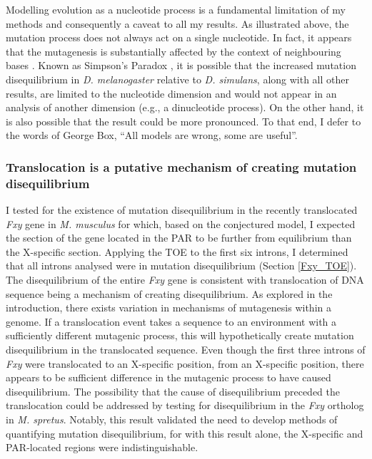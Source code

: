 Modelling evolution as a nucleotide process is a fundamental limitation of my methods and consequently a caveat to all my results. As illustrated above, the mutation process does not always act on a single nucleotide. In fact, it appears that the mutagenesis is substantially affected by the context of neighbouring bases \citep{Zhu2020MachineMutations}. Known as Simpson's Paradox \citep{Simpson1951TheTables}, it is possible that the increased mutation disequilibrium in \textit{D. melanogaster} relative to \textit{D. simulans}, along with all other results, are limited to the nucleotide dimension and would not appear in an analysis of another dimension (e.g., a  dinucleotide process). On the other hand, it is also possible that the result could be more pronounced. To that end, I defer to the words of George Box, ``All models are wrong, some are useful''. 

\subsubsection{Translocation is a putative mechanism of creating mutation disequilibrium}

I tested for the existence of mutation disequilibrium in the recently translocated \textit{Fxy} gene in \textit{M. musculus} for which, based on the conjectured model, I expected the section of the gene located in the PAR to be further from equilibrium than the X-specific section. Applying the TOE to the first six introns, I determined that all introns analysed were in mutation disequilibrium (Section \ref{Fxy_TOE}). The disequilibrium of the entire \textit{Fxy} gene is consistent with translocation of DNA sequence being a mechanism of creating disequilibrium. As explored in the introduction, there exists variation in mechanisms of mutagenesis within a genome. If a translocation event takes a sequence to an environment with a sufficiently different mutagenic process, this will hypothetically create mutation disequilibrium in the translocated sequence. Even though the first three introns of \textit{Fxy} were translocated to an X-specific position, from an X-specific position, there appears to be sufficient difference in the mutagenic process to have caused disequilibrium. The possibility that the cause of disequilibrium preceded the translocation could be addressed by testing for disequilibrium in the \textit{Fxy} ortholog in \textit{M. spretus}. Notably, this result validated the need to develop methods of quantifying mutation disequilibrium, for with this result alone, the X-specific and PAR-located regions were indistinguishable.


